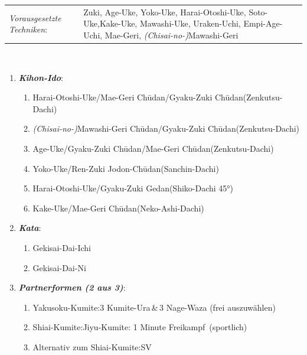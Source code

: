 \documentclass[a5paper,landscape,DIV=calc,11pt,notitlepage]{scrartcl}
\begin{document}
\pagebreak
\begin{tcolorbox}[colback=white,colframe=GBELT,coltitle=white,title=6. Kyu: Grün]
	\renewcommand{\labelenumi}{\alph{enumi}.)}
	\renewcommand{\labelenumii}{\arabic*.}
	{\scriptsize
		\begin{tabularx}{\textwidth}{lX}
			\textit{Vorausgesetzte Techniken}:& Zuki, Age-Uke, Yoko-Uke, Harai-Otoshi-Uke, Soto-Uke,Kake-Uke, Mawashi-Uke, Uraken-Uchi, Empi-Age-Uchi, Mae-Geri, \textit{(Chisai-no-)}Mawashi-Geri
		\end{tabularx}\\}
	\begin{enumerate}[nosep]
		\item \textit{\textbf{Kihon-Ido}}:
		\begin{enumerate}[nosep]
			\item Harai-Otoshi-Uke/Mae-Geri Ch\={u}dan/Gyaku-Zuki Ch\={u}dan\tabto{280pt}(Zenkutsu-Dachi)
			\item \textit{(Chisai-no-)}Mawashi-Geri Ch\={u}dan/Gyaku-Zuki Ch\={u}dan\tabto{280pt}(Zenkutsu-Dachi)
			\item Age-Uke/Gyaku-Zuki Ch\={u}dan/Mae-Geri Ch\={u}dan\tabto{280pt}(Zenkutsu-Dachi)
			\item Yoko-Uke/Ren-Zuki Jodon-Ch\={u}dan\tabto{280pt}(Sanchin-Dachi)
			\item Harai-Otoshi-Uke/Gyaku-Zuki Gedan\tabto{280pt}(Shiko-Dachi 45°)
			\item Kake-Uke/Mae-Geri Ch\={u}dan\tabto{280pt}(Neko-Ashi-Dachi)
		\end{enumerate}
		\item \textit{\textbf{Kata}}:
		\begin{enumerate}[nosep]
			\item Gekisai-Dai-Ichi
			\item Gekisai-Dai-Ni
		\end{enumerate}
		\item \textit{\textbf{Partnerformen (2 aus 3)}}:
		\begin{enumerate}[nosep]
			\item Yakusoku-Kumite:\tabto{200pt}3 Kumite-Ura\,\&\,3 Nage-Waza (frei auszuwählen)
			\item Shiai-Kumite:\tabto{200pt}Jiyu-Kumite: 1 Minute \frqq Freikampf\flqq~(sportlich)
			\item Alternativ zum Shiai-Kumite:\tabto{200pt}SV
		\end{enumerate}
	\end{enumerate}
\end{tcolorbox}
\end{document}
